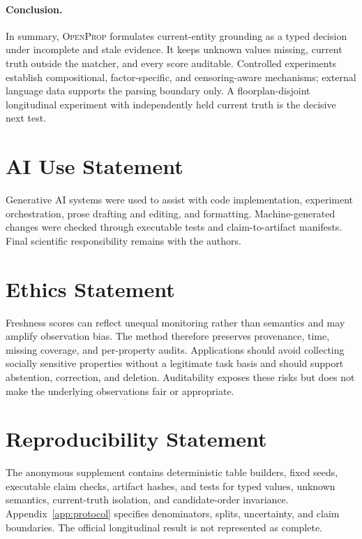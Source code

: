 \documentclass{article}
\newcommand{\method}{\textsc{OpenProp}}
\begin{document}
\paragraph{Conclusion.}
In summary, \method{} formulates current-entity grounding as a typed decision under incomplete and stale evidence. It keeps unknown values missing, current truth outside the matcher, and every score auditable. Controlled experiments establish compositional, factor-specific, and censoring-aware mechanisms; external language data supports the parsing boundary only. A floorplan-disjoint longitudinal experiment with independently held current truth is the decisive next test.
\label{sec:main-end}

\section*{AI Use Statement}
Generative AI systems were used to assist with code implementation, experiment orchestration, prose drafting and editing, and formatting. Machine-generated changes were checked through executable tests and claim-to-artifact manifests. Final scientific responsibility remains with the authors.

\section*{Ethics Statement}
Freshness scores can reflect unequal monitoring rather than semantics and may amplify observation bias. The method therefore preserves provenance, time, missing coverage, and per-property audits. Applications should avoid collecting socially sensitive properties without a legitimate task basis and should support abstention, correction, and deletion. Auditability exposes these risks but does not make the underlying observations fair or appropriate.

\section*{Reproducibility Statement}
The anonymous supplement contains deterministic table builders, fixed seeds, executable claim checks, artifact hashes, and tests for typed values, unknown semantics, current-truth isolation, and candidate-order invariance. Appendix~\ref{app:protocol} specifies denominators, splits, uncertainty, and claim boundaries. The official longitudinal result is not represented as complete.



\end{document}
